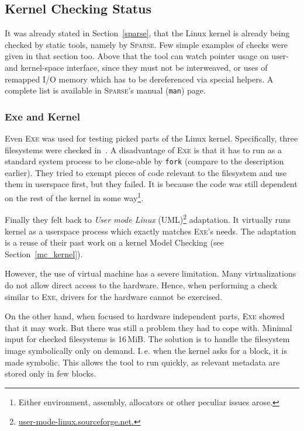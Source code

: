 \documentclass[11pt,a4paper]{article}
\begin{document}
\subsection{Kernel Checking Status}
\label{sparse-detail}
It was already stated in Section~\ref{sparse}, that the Linux kernel is
already being checked by static tools, namely by \textsc{Sparse}. Few simple
examples of checks were given in that section too. Above that the tool can
watch pointer usage on user- and kernel-space interface, since they must not
be interweaved, or uses of remapped I/O memory which has to be dereferenced
via special helpers. A complete list is available in \textsc{Sparse}'s manual
(\texttt{man}) page.

\subsubsection{Exe and Kernel}
\label{exe_kernel}
%
Even \textsc{Exe} was used for testing picked parts of the Linux kernel.
Specifically, three filesystems were checked in~\cite{exe_fs}. A disadvantage
of \textsc{Exe} is that it has to run as a standard system process to be
clone-able by \texttt{fork} (compare to the description earlier). They tried
to exempt pieces of code relevant to the filesystem and use them in userspace
first, but they failed. It is because the code was still dependent on the rest
of the kernel in some way\footnote{Either environment, assembly, allocators or
other peculiar issues arose.}.

Finally they felt back to \emph{User mode Linux}
(UML)\footnote{\url{user-mode-linux.sourceforge.net.}} adaptation. It
virtually runs kernel as a userspace process which exactly matches
\textsc{Exe}'s needs. The adaptation is a reuse of their past work on a kernel
Model Checking (see Section~\ref{mc_kernel}).

However, the use of virtual machine has a severe limitation. Many
virtualizations do not allow direct access to the hardware. Hence, when
performing a check similar to \textsc{Exe}, drivers for the hardware cannot be
exercised.

On the other hand, when focused to hardware independent parts, \textsc{Exe}
showed that it may work. But there was still a problem they had to cope with.
Minimal input for checked filesystems is 16\,MiB. The solution is to handle
the filesystem image symbolically only on demand. I.\,e. when the kernel asks
for a block, it is made symbolic. This allows the tool to run quickly, as
relevant metadata are stored only in few blocks.
\end{document}
